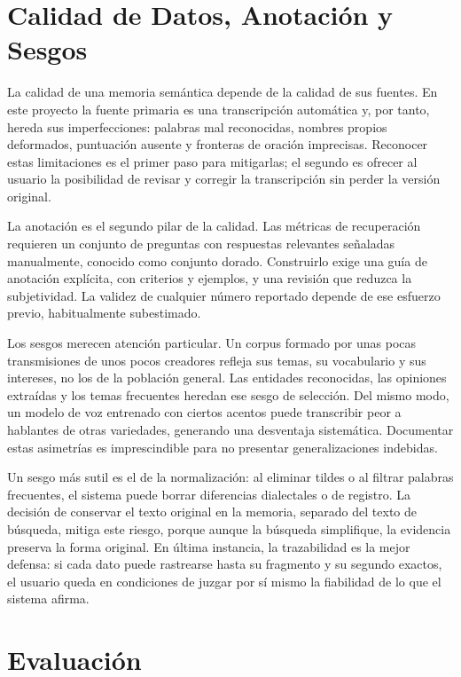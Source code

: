 \documentclass[12pt,a4paper]{article}
\begin{document}
\section{Calidad de Datos, Anotación y Sesgos}
\label{sec:calidad}

La calidad de una memoria semántica depende de la calidad de sus fuentes. En este proyecto la fuente primaria es una transcripción automática y, por tanto, hereda sus imperfecciones: palabras mal reconocidas, nombres propios deformados, puntuación ausente y fronteras de oración imprecisas. Reconocer estas limitaciones es el primer paso para mitigarlas; el segundo es ofrecer al usuario la posibilidad de revisar y corregir la transcripción sin perder la versión original.

La anotación es el segundo pilar de la calidad. Las métricas de recuperación requieren un conjunto de preguntas con respuestas relevantes señaladas manualmente, conocido como conjunto dorado. Construirlo exige una guía de anotación explícita, con criterios y ejemplos, y una revisión que reduzca la subjetividad. La validez de cualquier número reportado depende de ese esfuerzo previo, habitualmente subestimado.

Los sesgos merecen atención particular. Un corpus formado por unas pocas transmisiones de unos pocos creadores refleja sus temas, su vocabulario y sus intereses, no los de la población general. Las entidades reconocidas, las opiniones extraídas y los temas frecuentes heredan ese sesgo de selección. Del mismo modo, un modelo de voz entrenado con ciertos acentos puede transcribir peor a hablantes de otras variedades, generando una desventaja sistemática. Documentar estas asimetrías es imprescindible para no presentar generalizaciones indebidas.

Un sesgo más sutil es el de la normalización: al eliminar tildes o al filtrar palabras frecuentes, el sistema puede borrar diferencias dialectales o de registro. La decisión de conservar el texto original en la memoria, separado del texto de búsqueda, mitiga este riesgo, porque aunque la búsqueda simplifique, la evidencia preserva la forma original. En última instancia, la trazabilidad es la mejor defensa: si cada dato puede rastrearse hasta su fragmento y su segundo exactos, el usuario queda en condiciones de juzgar por sí mismo la fiabilidad de lo que el sistema afirma.


\section{Evaluación}
\label{sec:evaluacion}
\end{document}
